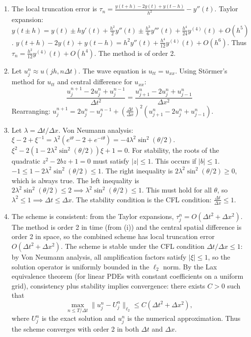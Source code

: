 \begin{solution}
\begin{enumerate}
    \item[(i)] The local truncation error is $\tau_n = \frac{y(t+h) - 2y(t) + y(t-h)}{h^2} - y''(t)$.
    Taylor expansion: $y(t \pm h) = y(t) \pm h y'(t) + \frac{h^2}{2} y''(t) \pm \frac{h^3}{6} y'''(t) + \frac{h^4}{24} y^{(4)}(t) + O(h^5)$.
    $y(t+h) - 2y(t) + y(t-h) = h^2 y''(t) + \frac{h^4}{12} y^{(4)}(t) + O(h^6)$.
    Thus $\tau_n = \frac{h^2}{12} y^{(4)}(t) + O(h^4)$. The method is of order 2.

    \item[(ii)] Let $u_j^n \approx u(jh, n \Delta t)$. The wave equation is $u_{tt} = u_{xx}$.
    Using St\"ormer's method for $u_{tt}$ and central difference for $u_{xx}$:
    \[ \frac{u_j^{n+1} - 2u_j^n + u_j^{n-1}}{\Delta t^2} = \frac{u_{j+1}^n - 2u_j^n + u_{j-1}^n}{\Delta x^2} \]
    Rearranging: $u_j^{n+1} = 2u_j^n - u_j^{n-1} + \left(\frac{\Delta t}{\Delta x}\right)^2 (u_{j+1}^n - 2u_j^n + u_{j-1}^n)$.

    \item[(iii)] Let $\lambda = \Delta t / \Delta x$. Von Neumann analysis:
    $\xi - 2 + \xi^{-1} = \lambda^2 (e^{i\theta} - 2 + e^{-i\theta}) = -4\lambda^2 \sin^2(\theta/2)$.
    $\xi^2 - 2(1 - 2\lambda^2 \sin^2(\theta/2))\xi + 1 = 0$.
    For stability, the roots of the quadratic $z^2 - 2bz + 1 = 0$ must satisfy $|z| \leq 1$. This occurs if $|b| \leq 1$.
    $-1 \leq 1 - 2\lambda^2 \sin^2(\theta/2) \leq 1$.
    The right inequality is $2\lambda^2 \sin^2(\theta/2) \geq 0$, which is always true.
    The left inequality is $2\lambda^2 \sin^2(\theta/2) \leq 2 \implies \lambda^2 \sin^2(\theta/2) \leq 1$.
    This must hold for all $\theta$, so $\lambda^2 \leq 1 \implies \Delta t \leq \Delta x$.
    The stability condition is the CFL condition: $\frac{\Delta t}{\Delta x} \leq 1$.

    \item[(iv)] The scheme is consistent: from the Taylor expansions,
    $\tau_j^n = O(\Delta t^2 + \Delta x^2)$. The method is order 2 in time (from (i)) and the central spatial difference is order 2 in space, so the combined scheme has local truncation error $O(\Delta t^2 + \Delta x^2)$.
    The scheme is stable under the CFL condition $\Delta t / \Delta x \leq 1$: by Von Neumann analysis, all amplification factors satisfy $|\xi| \leq 1$, so the solution operator is uniformly bounded in the $\ell_2$ norm.
    By the Lax equivalence theorem (for linear PDEs with constant coefficients on a uniform grid), consistency plus stability implies convergence: there exists $C > 0$ such that
    \[ \max_{n \leq T/\Delta t} \|u_j^n - U_j^n\|_{\ell_2} \leq C(\Delta t^2 + \Delta x^2), \]
    where $U_j^n$ is the exact solution and $u_j^n$ is the numerical approximation. Thus the scheme converges with order 2 in both $\Delta t$ and $\Delta x$.
\end{enumerate}
\end{solution}
